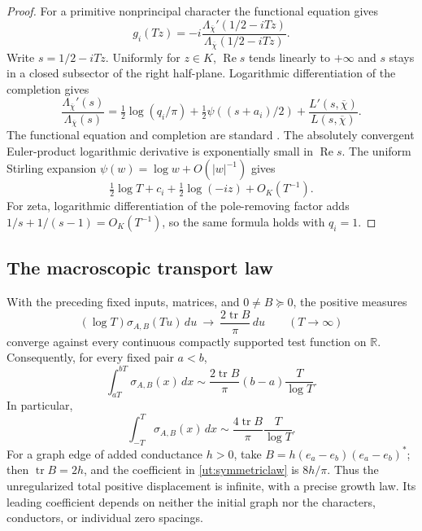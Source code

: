 \begin{proof}
For a primitive nonprincipal character the functional equation gives
\[
 g_i(Tz)=-i\frac{\Lambda_{\overline\chi}'(1/2-iTz)}
                         {\Lambda_{\overline\chi}(1/2-iTz)}.
\]
Write $s=1/2-iTz$. Uniformly for $z\in K$, $\operatorname{Re}s$ tends
linearly to $+\infty$ and $s$ stays in a closed subsector of the right
half-plane. Logarithmic differentiation of the completion gives
\[
 \frac{\Lambda_{\overline\chi}'(s)}{\Lambda_{\overline\chi}(s)}
 =\tfrac12\log(q_i/\pi)
       +\tfrac12\psi((s+a_i)/2)
       +\frac{L'(s,\overline\chi)}{L(s,\overline\chi)}.
\]
The functional equation and completion are standard \cite{dlmfdirichlet}.
The absolutely convergent Euler-product logarithmic derivative is
exponentially small in $\operatorname{Re}s$. The uniform Stirling
expansion $\psi(w)=\log w+O(|w|^{-1})$ gives
\[
 \tfrac12\log T+c_i+\tfrac12\log(-iz)+O_K(T^{-1}).
\]
For zeta, logarithmic differentiation of the pole-removing factor adds
$1/s+1/(s-1)=O_K(T^{-1})$, so the same formula holds with $q_i=1$.
\end{proof}

\subsection{The macroscopic transport law}

\begin{theorem}\label{ut:main}
With the preceding fixed inputs, matrices, and $0\ne B\succeq0$, the
positive measures
\begin{equation}\label{ut:weaklimit}
   (\log T)\sigma_{A,B}(Tu)\,du
        \ \longrightarrow\ \frac{2\operatorname{tr}B}{\pi}\,du
        \qquad(T\to\infty)
\end{equation}
converge against every continuous compactly supported test function on
$\mathbb R$. Consequently, for every fixed pair $a<b$,
\begin{equation}\label{ut:windowlaw}
 \boxed{\quad
 \int_{aT}^{bT}\sigma_{A,B}(x)\,dx
       \sim \frac{2\operatorname{tr}B}{\pi}(b-a)
                          \frac{T}{\log T}.
 \quad}
\end{equation}
In particular,
\begin{equation}\label{ut:symmetriclaw}
 \int_{-T}^{T}\sigma_{A,B}(x)\,dx
       \sim\frac{4\operatorname{tr}B}{\pi}\frac{T}{\log T}.
\end{equation}
For a graph edge of added conductance $h>0$, take
$B=h(e_a-e_b)(e_a-e_b)^*$; then $\operatorname{tr}B=2h$, and the
coefficient in \eqref{ut:symmetriclaw} is $8h/\pi$.
Thus the unregularized total positive displacement is infinite, with a
precise growth law. Its leading coefficient depends on neither the
initial graph nor the characters, conductors, or individual zero spacings.
\end{theorem}

